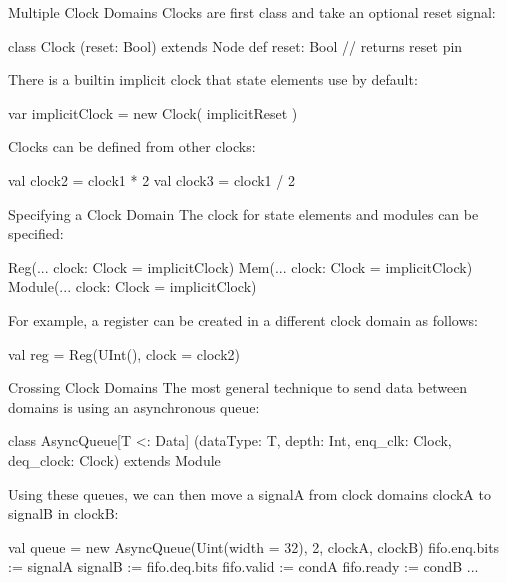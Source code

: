 \documentclass[xcolor=pdflatex,dvipsnames,table]{beamer}
\begin{document}
\begin{frame}[fragile]{Multiple Clock Domains}
Clocks are first class and take an optional reset signal:
\begin{scala}
class Clock (reset: Bool) extends Node { 
  def reset: Bool // returns reset pin 
}
\end{scala}
 
There is a builtin implicit clock that state elements use by default:
\begin{scala}
var implicitClock = new Clock( implicitReset )
\end{scala}
 
Clocks can be defined from other clocks:
\begin{scala} 
val clock2 = clock1 * 2 
val clock3 = clock1 / 2 
\end{scala}

\end{frame}

\begin{frame}[fragile]{Specifying a Clock Domain}
The clock for state elements and modules can be specified:
\begin{scala} 
Reg(... clock: Clock = implicitClock) 
Mem(... clock: Clock = implicitClock) 
Module(... clock: Clock = implicitClock)
\end{scala}

For example, a register can be created in a different clock domain as follows:
\begin{scala} 
val reg = Reg(UInt(), clock = clock2)
\end{scala}

\end{frame}
 
\begin{frame}[fragile]{Crossing Clock Domains}
The most general technique to send data between domains is using an asynchronous queue:

\begin{scala} 
class AsyncQueue[T <: Data]
    (dataType: T, depth: Int, enq_clk: Clock, deq_clock: Clock) extends Module
\end{scala}
 
Using these queues, we can then move a signalA from clock domains clockA to signalB in clockB:

\begin{scala} 
val queue = new AsyncQueue(Uint(width = 32), 2, clockA, clockB) 
fifo.enq.bits := signalA 
signalB       := fifo.deq.bits 
fifo.valid    := condA 
fifo.ready    := condB 
...
\end{scala}

\end{frame}
\end{document}
